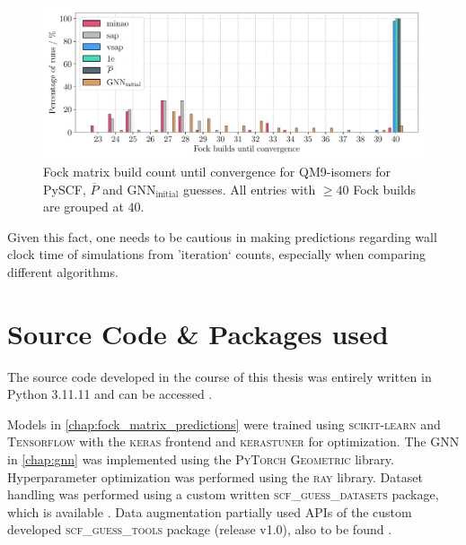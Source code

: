 \begin{figure}[H]
    \centering
    \includegraphics[width=\textwidth]{../fig/gnn/SO_0D_GNN_model_fock_build_count_bar.pdf}
    \caption[Fock matrix build count until convergence QM9-isomers]{Fock matrix build count until convergence for QM9-isomers for PySCF, $\overline{P}$ and GNN$_\text{initial}$ guesses. All entries with $\geq 40$ Fock builds are grouped at $40$.}
    \label{fig:so_fock_build_iterations}
\end{figure}
Given this fact, one needs to be cautious in making predictions regarding wall clock time of simulations from 'iteration` counts, especially when comparing different algorithms.

\section{Source Code \& Packages used}
\label{sec:source_code_packages}
The source code developed in the course of this thesis was entirely written in Python 3.11.11 \parencite{ref:python} and can be accessed . \parencite{ref:molgraphnetwork}

Models in \autoref{chap:fock_matrix_predictions} were trained using \textsc{scikit-learn} \parencite{ref:sk-learn} and \textsc{Tensorflow} \parencite{ref:tensorflow} with the \textsc{keras} frontend \parencite{ref:keras} and \textsc{kerastuner} \parencite{ref:kerastuner} for optimization. The GNN in \autoref{chap:gnn} was implemented using the \textsc{PyTorch Geometric} library. \parencite{ref:PyTorchGeometric} Hyperparameter optimization was performed using the \textsc{ray} library. \parencite{ref:ray_tune} Dataset handling was performed using a custom written \textsc{scf\_guess\_datasets} package, which is available . \parencite{ref:milacher_scf_guess_datasets} Data augmentation partially used APIs of the custom developed \textsc{scf\_guess\_tools} package (release v1.0), also to be found . \parencite{ref:scf_guess_tools}